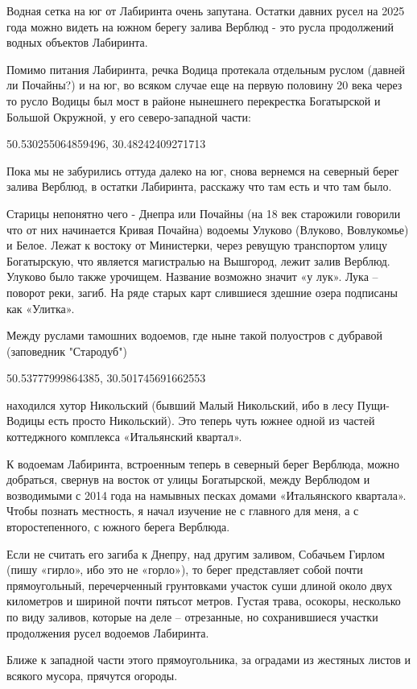Водная сетка на юг от Лабиринта очень запутана. Остатки давних русел на 2025 года можно видеть на южном берегу залива Верблюд - это русла продолжений водных объектов Лабиринта.

Помимо питания Лабиринта, речка Водица протекала отдельным руслом (давней ли Почайны?) и на юг, во всяком случае еще на первую половину 20 века через то русло Водицы был мост в районе нынешнего перекрестка Богатырской и Большой Окружной, у его северо-западной части:

50.530255064859496, 30.48242409271713

Пока мы не забурились оттуда далеко на юг, снова вернемся на северный берег залива Верблюд, в остатки Лабиринта, расскажу что там есть и что там было.

Старицы непонятно чего - Днепра или Почайны (на 18 век старожили говорили что от них начинается Кривая Почайна) водоемы Улуково (Влуково, Вовлукомье) и Белое. Лежат к востоку от Министерки, через ревущую транспортом улицу Богатырскую, что является магистралью на Вышгород, лежит залив Верблюд. Улуково было также урочищем. Название возможно 
значит «у лук». Лука – поворот реки, загиб. 
На ряде старых карт слившиеся здешние озера подписаны как «Улитка».

Между руслами тамошних водоемов, где ныне такой полуостров с дубравой (заповедник "Стародуб")

50.53777999864385, 30.501745691662553

находился хутор Никольский (бывший Малый Никольский, ибо в лесу Пущи-Водицы есть просто Никольский). Это теперь чуть южнее одной из частей коттеджного комплекса «Итальянский квартал».

К водоемам Лабиринта, встроенным теперь в северный берег Верблюда, можно добраться, свернув на восток от улицы Богатырской, между Верблюдом и возводимыми с 2014 года на намывных песках домами «Итальянского квартала». Чтобы познать местность, я начал изучение не с главного для меня, а с второстепенного, с южного берега Верблюда.

Если не считать его загиба к Днепру, над другим заливом, Собачьем Гирлом (пишу «гирло», ибо это не «горло»), то берег представляет собой почти прямоугольный, перечерченный грунтовками участок суши длиной около двух километров и шириной почти пятьсот метров. Густая трава, осокоры, несколько по виду заливов, которые на деле – отрезанные, но сохранившиеся участки продолжения русел 
водоемов Лабиринта.

Ближе к западной части этого прямоугольника, за оградами из жестяных листов и всякого мусора, прячутся огороды.

